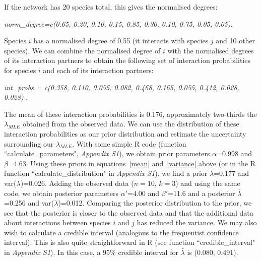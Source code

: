 \documentclass[12pt]{article}
\begin{document}
    If the network has 20 species total, this gives the normalised degrees:

    \vspace{12pt}
    \noindent\emph{
      norm\_degree=c(0.65, 0.20, 0.10, 0.15, 0.85, 0.30, 0.10, 0.75, 0.05, 0.05)}.
      \vspace{12pt}

    Species $i$ has a normalised degree of 0.55 (it interacts with species $j$ and 10 other species). We can combine the normalised degree of $i$ with the normalised degrees of its interaction partners to obtain the following set of interaction probabilities for species $i$ and each of its interaction partners:

    \vspace{12pt}
    \noindent\emph{
       int\_probs = c(0.358, 0.110, 0.055, 0.082, 0.468, 0.165, 0.055, 0.412, 0.028, 0.028) }.
      \vspace{12pt}

    The mean of these interaction probabilities is 0.176, approximately two-thirds the $\lambda_{MLE}$ obtained from the observed data. We can use the distribution of these interaction probabilities as our prior distribution and estimate the uncertainty surrounding our $\lambda_{MLE}$. With some simple R code (function ``calculate\_parameters", \emph{Appendix S1}), we obtain prior parameters $\alpha$=0.998 and $\beta$=4.63. Using these priors in equations~\ref{mean} and~\ref{variance} above (or in the R function ``calculate\_distribution" in \emph{Appendix S1}), we find a prior $\bar\lambda$=0.177 and var($\lambda$)=0.026. Adding the observed data ($n=10$, $k=3$) and using the same code, we obtain posterior parameters $\alpha'$=4.00 and $\beta'$=11.6 and a posterior $\bar\lambda$=0.256 and var($\lambda$)=0.012. Comparing the posterior distribution to the prior, we see that the posterior is closer to the observed data and that the additional data about interactions between species $i$ and $j$ has reduced the variance. We may also wish to calculate a credible interval (analogous to the frequentist confidence interval). This is also quite straightforward in R (see function ``credible\_interval" in \emph{Appendix S1}). In this case, a 95\% credible interval for $\bar\lambda$ is (0.080, 0.491).
\end{document}
